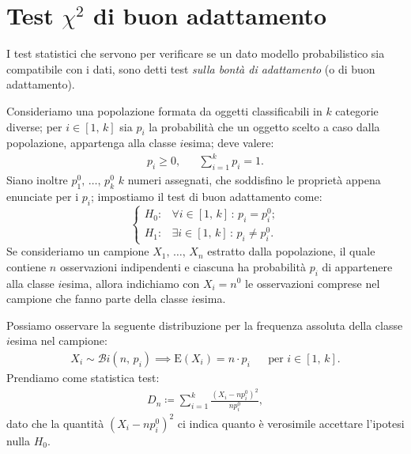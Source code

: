     \section{Test $\chi^2$ di buon adattamento}\label{sec:Chi2_buon_adattamento}
        \begin{defn}
            I test statistici che servono per verificare se un dato modello probabilistico sia 
            compatibile con i dati, sono detti test \emph{sulla bontà di adattamento} (o di 
            buon adattamento).
        \end{defn}
        \begin{defn}
            Consideriamo una popolazione formata da oggetti classificabili in $k$ categorie 
            diverse; per $i \in [1,\,k]$ sia $p_i$ la probabilità che un oggetto scelto a caso 
            dalla popolazione, appartenga alla classe $i$\nbdash esima; deve valere:
            \begin{align*}
                p_i \geq 0, & &
                \sum_{i=1}^{k} p_i = 1
            .\end{align*}
            Siano inoltre $p^0_1,\, \ldots,\, p^0_{k}$ $k$ numeri assegnati, che soddisfino le 
            proprietà appena enunciate per i $p_i$; impostiamo il test di buon adattamento come: \[
                \begin{cases}
                    H_0 : & \forall i \in [1,\,k] \,:\, p_i = p_i^0; \\
                    H_1 : & \exists i \in [1,\,k] \,:\, p_i \neq p_i^0.
                \end{cases}
            \] Se consideriamo un campione $X_1,\, \ldots,\, X_{n}$ estratto dalla popolazione, il 
            quale contiene $n$ osservazioni indipendenti e ciascuna ha probabilità $p_i$ di 
            appartenere alla classe $i$\nbdash esima, allora indichiamo con  $X_i = n^0$ le 
            osservazioni comprese nel campione che fanno parte della classe $i$\nbdash esima.

            Possiamo osservare la seguente distribuzione per la frequenza assoluta della 
            classe $i$\nbdash esima nel campione:
            \begin{align*}
                X_i \sim \mathcal{B}i(n,\,p_i) \implies \text{E}(X_i)= n\cdot p_i & &
                \text{per } i \in [1,\,k]
            .\end{align*}
            Prendiamo come statistica test:
            \begin{align*}
                D_n \coloneqq \sum_{i=1}^{k} \frac{(X_i -np_i^0)^2}{np_i^0}
            ,\end{align*}
            dato che la quantità $(X_i -np_i^0)^2$ ci indica quanto è verosimile accettare 
            l'ipotesi nulla $H_0$.


\end{defn}

